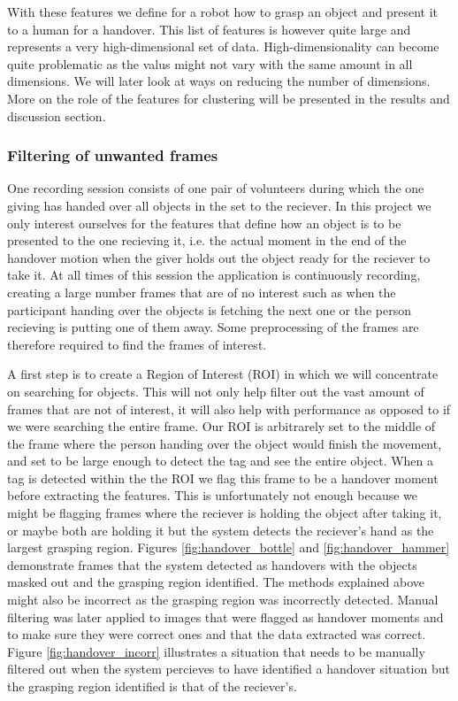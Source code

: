 With these features we define for a robot how to grasp an object and present it to a human for a handover.  This list of features is however quite large and represents a very high-dimensional set of data. High-dimensionality can become quite problematic as the valus might not vary with the same amount in all dimensions. We will later look at ways on reducing the number of dimensions. More on the role of the features for clustering will be presented in the results and discussion section.

\subsubsection{Filtering of unwanted frames}

One recording session consists of one pair of volunteers during which the one giving has handed over all objects in the set to the reciever. In this project we only interest ourselves for the features that define how an object is to be presented to the one recieving it, i.e. the actual moment in the end of the handover motion when the giver holds out the object ready for the reciever to take it. At all times of this session the application is continuously recording, creating a large number frames that are of no interest such as when the participant handing over the objects is fetching the next one or the person recieving is putting one of them away. Some preprocessing of the frames are therefore required to find the frames of interest.

A first step is to create a Region of Interest (ROI) in which we will concentrate on searching for objects. This will not only help filter out the vast amount of frames that are not of interest, it will also help with performance as opposed to if we were searching the entire frame. Our ROI is arbitrarely set to the middle of the frame where the person handing over the object would finish the movement, and set to be large enough to detect the tag and see the entire object. When a tag is detected within the the ROI we flag this frame to be a handover moment before extracting the features. This is unfortunately not enough because we might be flagging frames where the reciever is holding the object after taking it, or maybe both are holding it but the system detects the reciever's hand as the largest grasping region. Figures \ref{fig:handover_bottle} and \ref{fig:handover_hammer} demonstrate frames that the system detected as handovers with the objects masked out and the grasping region identified. The methods explained above might also be incorrect as the grasping region was incorrectly detected. Manual filtering was later applied to images that were flagged as handover moments and to make sure they were correct ones and that the data extracted was correct. Figure \ref{fig:handover_incorr} illustrates a situation that needs to be manually filtered out when the system percieves to have identified a handover situation but the grasping region identified is that of the reciever's.

